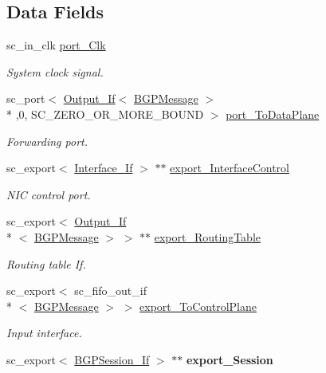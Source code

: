 \subsection*{Data Fields}
\begin{DoxyCompactItemize}
\item 
sc\-\_\-in\-\_\-clk \hyperlink{classControlPlane_ab0c4f01f5a65a86750cc4011bc531b70}{port\-\_\-\-Clk}
\begin{DoxyCompactList}\small\item\em System clock signal. \end{DoxyCompactList}\item 
sc\-\_\-port$<$ \hyperlink{classOutput__If}{Output\-\_\-\-If}$<$ \hyperlink{classBGPMessage}{B\-G\-P\-Message} $>$\\*
,0, S\-C\-\_\-\-Z\-E\-R\-O\-\_\-\-O\-R\-\_\-\-M\-O\-R\-E\-\_\-\-B\-O\-U\-N\-D $>$ \hyperlink{classControlPlane_adff1abdc123100e569d92ce1485a378e}{port\-\_\-\-To\-Data\-Plane}
\begin{DoxyCompactList}\small\item\em Forwarding port. \end{DoxyCompactList}\item 
\hypertarget{classControlPlane_a76e565e9e2be198c1d67944db521f466}{sc\-\_\-export$<$ \hyperlink{classInterface__If}{Interface\-\_\-\-If} $>$ $\ast$$\ast$ \hyperlink{classControlPlane_a76e565e9e2be198c1d67944db521f466}{export\-\_\-\-Interface\-Control}}\label{classControlPlane_a76e565e9e2be198c1d67944db521f466}

\begin{DoxyCompactList}\small\item\em N\-I\-C control port. \end{DoxyCompactList}\item 
sc\-\_\-export$<$ \hyperlink{classOutput__If}{Output\-\_\-\-If}\\*
$<$ \hyperlink{classBGPMessage}{B\-G\-P\-Message} $>$ $>$ $\ast$$\ast$ \hyperlink{classControlPlane_a7045b3cc322a96eed95d40df9e388964}{export\-\_\-\-Routing\-Table}
\begin{DoxyCompactList}\small\item\em Routing table If. \end{DoxyCompactList}\item 
sc\-\_\-export$<$ sc\-\_\-fifo\-\_\-out\-\_\-if\\*
$<$ \hyperlink{classBGPMessage}{B\-G\-P\-Message} $>$ $>$ \hyperlink{classControlPlane_a8eeed022eec78d21f65728c01490684e}{export\-\_\-\-To\-Control\-Plane}
\begin{DoxyCompactList}\small\item\em Input interface. \end{DoxyCompactList}\item 
\hypertarget{classControlPlane_a69d5761d8047ee6e73f7b539cf8676a0}{sc\-\_\-export$<$ \hyperlink{classBGPSession__If}{B\-G\-P\-Session\-\_\-\-If} $>$ $\ast$$\ast$ {\bfseries export\-\_\-\-Session}}\label{classControlPlane_a69d5761d8047ee6e73f7b539cf8676a0}


\end{DoxyCompactItemize}
